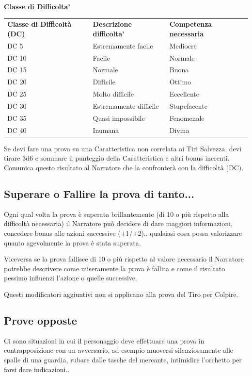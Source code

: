 \documentclass[a4paper,11pt,twoside,openany]{book}
\begin{document}
\bigskip

\textbf{Classe di Difficolta'}
\medskip

\begin{tabular}{lll}
\toprule
\textbf{Classe di Difficoltà (DC)} & \textbf{Descrizione difficolta'} &\textbf{ Competenza necessaria}\tabularnewline
DC 5 & Estremamente facile & Mediocre\tabularnewline
DC 10 & Facile & Normale\tabularnewline
DC 15 & Normale & Buona\tabularnewline
DC 20 & Difficile & Ottimo\tabularnewline
DC 25 & Molto difficile & Eccellente\tabularnewline
DC 30 & Estremamente difficile & Stupefacente\tabularnewline
DC 35 & Quasi impossibile & Fenomenale\tabularnewline
DC 40 & Inumana & Divina\tabularnewline

\end{tabular}

\bigskip

Se devi fare una prova su una Caratteristica non correlata ai Tiri Salvezza, devi tirare 3d6 e sommare il punteggio della Caratteristica e altri bonus inerenti. Comunica questo risultato al Narratore che la confronterà con la difficoltà (DC).

\subsection{Superare o Fallire la prova di tanto...}

Ogni qual volta la prova è superata brillantemente (di 10 o più rispetto alla difficoltà necessaria) il Narratore può decidere di dare maggiori informazioni, concedere bonus alle azioni successive (+1/+2).. qualsiasi cosa possa valorizzare quanto agevolmente la prova è stata superata.

Viceversa se la prova fallisce di 10 o più rispetto al valore necessario il Narratore potrebbe descrivere come miseramente la prova è fallita e come il risultato pessimo influenzi l'azione o quelle successive.

Questi modificatori aggiuntivi non si applicano alla prova del Tiro per Colpire.

\subsection{Prove opposte}

Ci sono situazioni in cui il personaggio deve effettuare una prova in contrapposizione con un avversario, ad esempio muoversi silenziosamente alle spalle di una guardia, rubare dalle tasche del mercante, intimidire l'orchetto per farsi dare indicazioni..
\end{document}

